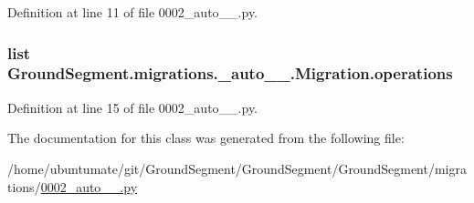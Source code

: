 Definition at line 11 of file 0002\+\_\+auto\+\_\+\_.\+py.

\hypertarget{class_ground_segment_1_1migrations_1_10002__auto__20161126__1037_1_1_migration_a3af614388c347ff52dbaf98d9be3516d}{}
\subsubsection[{operations}]{\setlength{\rightskip}{0pt plus 5cm}list Ground\+Segment.\+migrations.\+\_\+auto\+\_\+\_.\+Migration.\+operations\hspace{0.3cm}{\ttfamily [static]}}\label{class_ground_segment_1_1migrations_1_10002__auto__20161126__1037_1_1_migration_a3af614388c347ff52dbaf98d9be3516d}


Definition at line 15 of file 0002\+\_\+auto\+\_\+\_.\+py.



The documentation for this class was generated from the following file\+:\begin{DoxyCompactItemize}
\item 
/home/ubuntumate/git/\+Ground\+Segment/\+Ground\+Segment/\+Ground\+Segment/migrations/\hyperlink{0002__auto__20161126__1037_8py}{0002\+\_\+auto\+\_\+\_.\+py}\end{DoxyCompactItemize}
